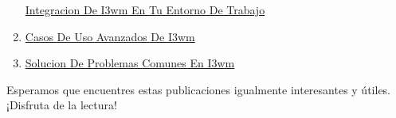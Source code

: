 \documentclass[
  jou,
  floatsintext,
  longtable,
  a4paper,
  nolmodern,
  notxfonts,
  notimes,
  colorlinks=true,linkcolor=blue,citecolor=blue,urlcolor=blue]{apa7}
\begin{document}
\begin{enumerate}
  \href{https://achalmaedison.netlify.app/tecnologia-seguridad/i3wm/2020-02-21-integracion-de-i3wm-en-tu-entorno-de-trabajo}{Integracion
  De I3wm En Tu Entorno De Trabajo}
\item
  \href{https://achalmaedison.netlify.app/tecnologia-seguridad/i3wm/2020-02-22-casos-de-uso-avanzados-de-i3wm/index.pdf}{}
  \href{https://achalmaedison.netlify.app/tecnologia-seguridad/i3wm/2020-02-22-casos-de-uso-avanzados-de-i3wm}{Casos
  De Uso Avanzados De I3wm}
\item
  \href{https://achalmaedison.netlify.app/tecnologia-seguridad/i3wm/2020-02-23-solucion-de-problemas-comunes-en-i3wm/index.pdf}{}
  \href{https://achalmaedison.netlify.app/tecnologia-seguridad/i3wm/2020-02-23-solucion-de-problemas-comunes-en-i3wm}{Solucion
  De Problemas Comunes En I3wm}
\end{enumerate}

Esperamos que encuentres estas publicaciones igualmente interesantes y
útiles. ¡Disfruta de la lectura!
\end{document}
